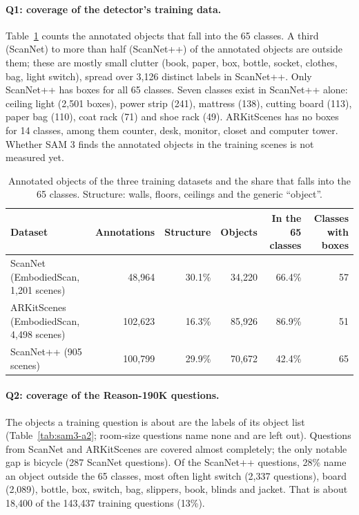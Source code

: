 \paragraph{Q1: coverage of the detector's training data.}
Table~\ref{tab:sam3-a1} counts the annotated objects that fall into the 65 classes. A third (ScanNet) to more
than half (ScanNet++) of the annotated objects are outside them; these are mostly small clutter (book, paper,
box, bottle, socket, clothes, bag, light switch), spread over 3,126 distinct labels in ScanNet++. Only
ScanNet++ has boxes for all 65 classes. Seven classes exist in ScanNet++ alone: ceiling light (2,501 boxes),
power strip (241), mattress (138), cutting board (113), paper bag (110), coat rack (71) and shoe rack (49).
ARKitScenes has no boxes for 14 classes, among them counter, desk, monitor, closet and computer tower.
Whether SAM 3 finds the annotated objects in the training scenes is not measured yet.

\begin{table}[t]
\centering
\caption{Annotated objects of the three training datasets and the share that falls into the 65 classes.
Structure: walls, floors, ceilings and the generic ``object''.}
\label{tab:sam3-a1}
\begin{tabular}{lrrrrr}
\toprule
Dataset & Annotations & Structure & Objects & In the 65 classes & Classes with boxes \\
\midrule
ScanNet (EmbodiedScan, 1,201 scenes)     &  48,964 & 30.1\% & 34,220 & 66.4\% & 57 \\
ARKitScenes (EmbodiedScan, 4,498 scenes) & 102,623 & 16.3\% & 85,926 & 86.9\% & 51 \\
ScanNet++ (905 scenes)                   & 100,799 & 29.9\% & 70,672 & 42.4\% & 65 \\
\bottomrule
\end{tabular}
\end{table}

\paragraph{Q2: coverage of the Reason-190K questions.}
The objects a training question is about are the labels of its object list (Table~\ref{tab:sam3-a2};
room-size questions name none and are left out). Questions from ScanNet and ARKitScenes are covered almost
completely; the only notable gap is bicycle (287 ScanNet questions). Of the ScanNet++ questions, 28\% name an
object outside the 65 classes, most often light switch (2,337 questions), board (2,089), bottle, box, switch,
bag, slippers, book, blinds and jacket. That is about 18,400 of the 143,437 training questions (13\%).

